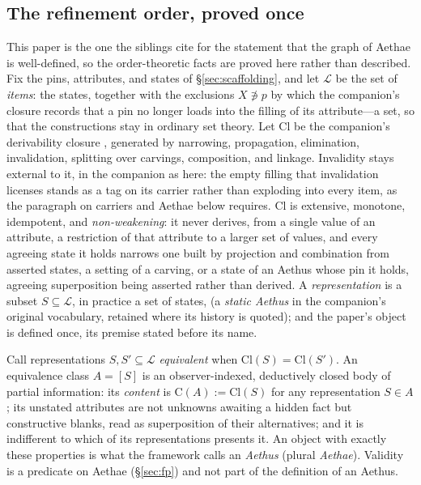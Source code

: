 \subsection{The refinement order, proved once}
\label{sec:order}
This paper is the one the siblings cite for the statement that the graph of Aethae is well-defined, so the order-theoretic facts are proved here rather than described. Fix the pins, attributes, and states of §\ref{sec:scaffolding}, and let $\mathcal{L}$ be the set of \emph{items}: the states, together with the exclusions $X \not\ni p$ by which the companion's closure records that a pin no longer loads into the filling of its attribute---a set, so that the constructions stay in ordinary set theory. Let $\mathrm{Cl}$ be the companion's derivability closure \cite{Aethus}, generated by narrowing, propagation, elimination, invalidation, splitting over carvings, composition, and linkage. Invalidity stays external to it, in the companion as here: the empty filling that invalidation licenses stands as a tag on its carrier rather than exploding into every item, as the paragraph on carriers and Aethae below requires. $\mathrm{Cl}$ is extensive, monotone, idempotent, and \emph{non-weakening}: it never derives, from a single value of an attribute, a restriction of that attribute to a larger set of values, and every agreeing state it holds narrows one built by projection and combination from asserted states, a setting of a carving, or a state of an Aethus whose pin it holds, agreeing superposition being asserted rather than derived. A \emph{representation} is a subset $S \subseteq \mathcal{L}$, in practice a set of states, (a \emph{static Aethus} in the companion's original vocabulary, retained where its history is quoted); and the paper's object is defined once, its premise stated before its name.

\begin{defin}[Aethus]\label{def:aethus}
Call representations $S, S' \subseteq \mathcal{L}$ \emph{equivalent} when $\mathrm{Cl}(S) = \mathrm{Cl}(S')$. An equivalence class $A = [S]$ is an observer-indexed, deductively closed body of partial information: its \emph{content} is $\mathrm{C}(A) := \mathrm{Cl}(S)$ for any representation $S \in A$; its unstated attributes are not unknowns awaiting a hidden fact but constructive blanks, read as superposition of their alternatives; and it is indifferent to which of its representations presents it. An object with exactly these properties is what the framework calls an \emph{Aethus} (plural \emph{Aethae}). Validity is a predicate on Aethae (§\ref{sec:fp}) and not part of the definition of an Aethus.
\end{defin}

